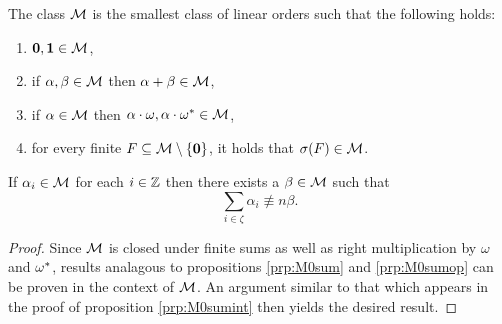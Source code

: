 \begin{dfn}
	The class $\mathcal{M}$ is the smallest class of linear orders such that the following holds:
	\begin{enumerate}
		\item	$\mathbf{0},\mathbf{1}\in\mathcal{M}$,
		\item	if $\alpha,\beta\in\mathcal{M}$ then $\alpha+\beta\in\mathcal{M}$,
		\item	if $\alpha\in\mathcal{M}$ then $\alpha\cdot\omega,\alpha\cdot{\omega}^\ast\in\mathcal{M}$,
		\item	for every finite $F\subseteq\mathcal{M}\setminus\left\lbrace \mathbf{0}\right\rbrace$, it holds that $\sigma(F)\in\mathcal{M}$.
	\end{enumerate}
\end{dfn}

\begin{prp}\label{prp:Msumint}
	If $\alpha_i\in\mathcal{M}$ for each $i\in\mathbb{Z}$ then there exists a $\beta\in\mathcal{M}$ such that
	\begin{equation}
		\sum_{i\in\zeta}\alpha_i\nequiv{n}\beta.
	\end{equation}
\end{prp}
\begin{proof}
	Since $\mathcal{M}$ is closed under finite sums as well as right multiplication by $\omega$ and ${\omega}^\ast$, results analagous to propositions \ref{prp:M0sum} and \ref{prp:M0sumop} can be proven in the context of $\mathcal{M}$.  An argument similar to that which appears in the proof of proposition \ref{prp:M0sumint} then yields the desired result.
\end{proof}

